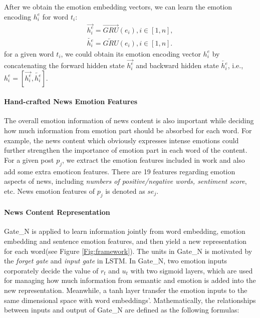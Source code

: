\documentclass[conference]{IEEEtran}
\newcommand{\kai}[1]{\textcolor{blue}{Kai: {#1}}}
\begin{document}
	After we obtain the emotion embedding vectors, we can learn the emotion encoding $h_i^e$ for word $t_i$:
	\begin{equation}
	\begin{aligned}
	\overrightarrow{h_i^e} = \overrightarrow{GRU}(e_i), i \in [1, n],\\
	\overleftarrow{h_i^e} = \overleftarrow{GRU}(e_i), i\in [1, n].
	\end{aligned}
	\end{equation}%
	for a given word $t_i$, we could obtain its emotion encoding vector $h_i^e$ by concatenating the forward hidden state $\overrightarrow{h_i^e}$ and backward hidden state $\overleftarrow{h_i^e}$, i.e., $h_i^e=[\overrightarrow{h_i^e}, \overleftarrow{h_i^e}]$.
	
	
	\paragraph{Hand-crafted News Emotion Features}
	The overall emotion information of news content is also important while deciding how much information from emotion part should be absorbed for each word. For example, the news content which obviously expresses intense emotions could further strengthen the importance of emotion part in each word of the content. For a given post $p_j$, we extract the emotion features included in work \cite{castillo2011information} and also add some extra emoticon features. There are 19 features regarding emotion aspects of news, including {\em numbers of positive/negative words, sentiment score}, etc. News emotion features of $p_j$ is denoted as $se_j$.
	\paragraph{News Content Representation}
	Gate\_N is applied to learn information jointly from word embedding, emotion embedding and sentence emotion features, and then yield a new representation for each word(see Figure \ref{Fig:framework}). The units in Gate\_N is motivated by the \textit{forget gate} and \textit{input gate} in LSTM. In Gate\_N, two emotion inputs corporately decide the value of $r_t$ and $u_t$ with two sigmoid layers, which are used for managing how much information from semantic and emotion is added into the new representation. Meanwhile, a tanh layer transfer the emotion inputs to the same dimensional space with word embeddings'. Mathematically, the relationships between inputs and output of Gate\_N are defined as the following formulas:
	
\end{document}
